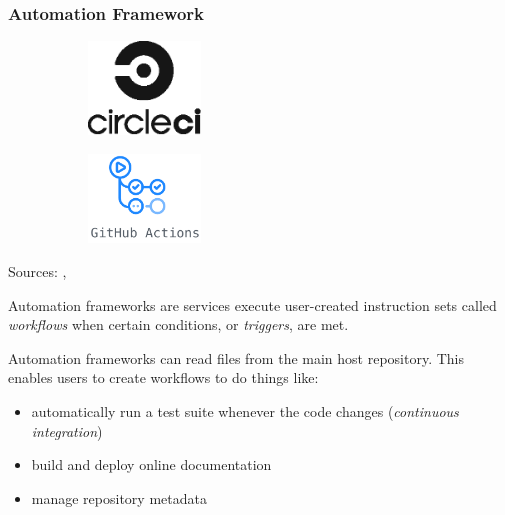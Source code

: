 \begin{frame}[t]
    \frametitle{Automation Framework}
    \begin{figure}[htpb]
        \begin{subfigure}
            \centering
            \includegraphics[width=3cm]{images/circleci-logo.eps}
        \end{subfigure}
        \begin{subfigure}
            \centering
            \includegraphics[width=3cm]{images/github-actions-logo.png}
        \end{subfigure}
    \end{figure}
    \begin{center}
        {\tiny Sources: \cite{circle_ci_logo}, \cite{github_actions_logo}}
    \end{center}

    Automation frameworks are services execute user-created instruction sets called {\it workflows} when certain conditions, or {\it triggers}, are met.

    Automation frameworks can read files from the main host repository. This enables users to create workflows to do things like:
    \begin{itemize}
        \item automatically run a test suite whenever the code changes ({\it continuous integration})
        \item build and deploy online documentation
        \item manage repository metadata
    \end{itemize}
    
\end{frame}

